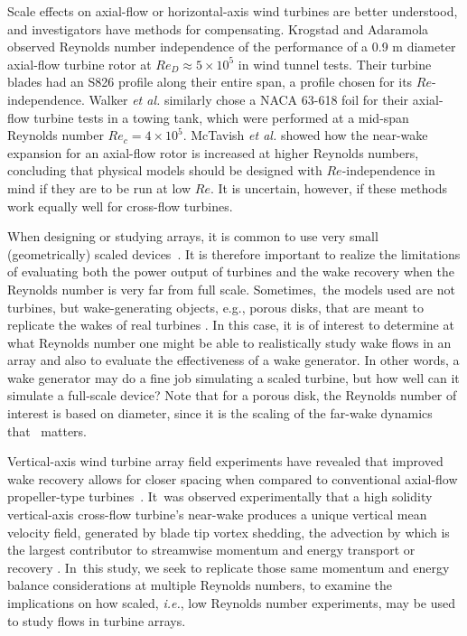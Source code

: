 \documentclass[energies,article,accept,moreauthors,pdftex,10pt,a4paper]{mdpi}
\theoremstyle{mdpi}
\newcounter{ex}
\newcounter{re}
\begin{document}
Scale effects on axial-flow or horizontal-axis wind turbines are better
understood, and investigators have methods for compensating. Krogstad and
Adaramola \cite{Krogstad2012a} observed Reynolds number independence of the
performance of a 0.9 m diameter axial-flow turbine rotor at $Re_D \approx 5
\times 10^5$ in wind tunnel tests. Their turbine blades had an S826 profile
along their entire span, a profile chosen for its $Re$-independence. Walker \emph{et
al.} \cite{Walker2014} similarly chose a NACA 63-618 foil for their axial-flow
turbine tests in a towing tank, which were performed at a mid-span Reynolds
number $Re_c = 4 \times 10^5$. McTavish \emph{et al.} \cite{McTavish2013} showed how
the near-wake expansion for an axial-flow rotor is increased at higher Reynolds
numbers, concluding that physical models should be designed with
$Re$-independence in mind if they are to be run at low $Re$. It is uncertain,
however, if these methods work equally well for cross-flow turbines.

When designing or studying arrays, it is common to use very small
(geometrically) scaled \mbox{devices \cite{Chamorro2011, Chamorro2011b}}. It is
therefore important to realize the limitations of evaluating both the power
output of turbines and the wake recovery when the Reynolds number is very far
from full scale. Sometimes,~the models used are not turbines, but
wake-generating objects, e.g., porous disks, that are meant to replicate the
wakes of real turbines \cite{Goldenberg1983}. In this case, it is of interest to
determine at what Reynolds number one might be able to realistically study wake
flows in an array and also to evaluate the effectiveness of a wake generator. In
other words, a wake generator may do a fine job simulating a scaled turbine, but
how well can it simulate a full-scale device? Note that for a porous disk, the
Reynolds number of interest is based on diameter, since it is the scaling of the
far-wake dynamics that~ matters.

Vertical-axis wind turbine array field experiments have revealed that improved
wake recovery allows for closer spacing when compared to conventional axial-flow
propeller-type \mbox{turbines \cite{Dabiri2011, Kinzel2012}}. It~was observed
experimentally that a high solidity vertical-axis cross-flow turbine's near-wake
produces a unique vertical mean velocity field, generated by blade tip vortex
shedding, the advection by which is the largest contributor to streamwise
momentum and energy transport or recovery \cite{Bachant2015-JoT}. In~this study,
we seek to replicate those same momentum and energy balance considerations at
multiple Reynolds numbers, to examine the implications on how scaled,
\emph{i.e.}, low Reynolds number experiments, may be used to study flows in
turbine arrays.
\end{document}
